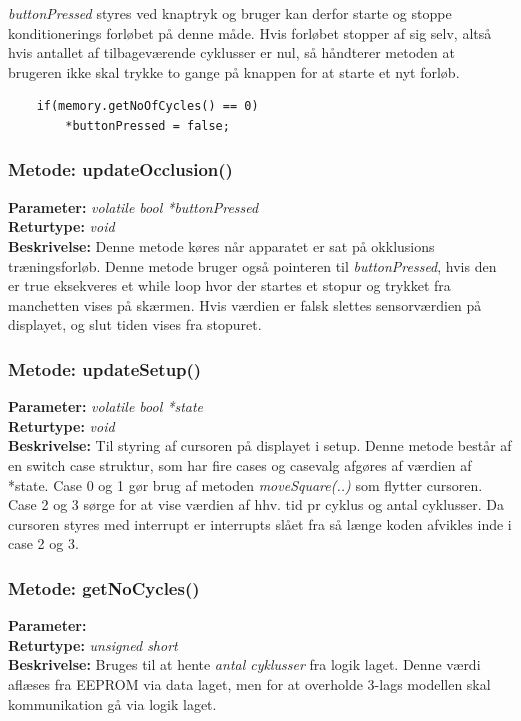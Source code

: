 \textit{buttonPressed} styres ved knaptryk og bruger kan derfor starte og stoppe konditionerings forløbet på denne måde. Hvis forløbet stopper af sig selv, altså hvis antallet af tilbageværende cyklusser er nul, så håndterer metoden at brugeren ikke skal trykke to gange på knappen for at starte et nyt forløb. 
\begin{lstlisting}
	if(memory.getNoOfCycles() == 0)
		*buttonPressed = false;
\end{lstlisting}

\subsubsection{Metode: updateOcclusion()}
\textbf{Parameter: } \textit{volatile bool *buttonPressed}
\\ \textbf{Returtype: } \textit{void}
\\ \textbf{Beskrivelse: } Denne metode køres når apparatet er sat på okklusions træningsforløb. Denne metode bruger også pointeren til \textit{buttonPressed}, hvis den er true eksekveres et while loop hvor der startes et stopur og trykket fra manchetten vises på skærmen. Hvis værdien er falsk slettes sensorværdien på displayet, og slut tiden vises fra stopuret.

\subsubsection{Metode: updateSetup()}
\textbf{Parameter: } \textit{volatile bool *state}
\\ \textbf{Returtype: } \textit{void}
\\ \textbf{Beskrivelse: } Til styring af cursoren på displayet i setup. Denne metode består af en switch case struktur, som har fire cases og casevalg afgøres af værdien af *state. Case 0 og 1 gør brug af metoden \textit{moveSquare(..)} som flytter cursoren. Case 2 og 3 sørge for at vise værdien af hhv. tid pr cyklus og antal cyklusser. Da cursoren styres med interrupt er interrupts slået fra så længe koden afvikles inde i case 2 og 3. 

\subsubsection{Metode: getNoCycles()}
\textbf{Parameter: } 
\\ \textbf{Returtype: } \textit{unsigned short}
\\ \textbf{Beskrivelse: } Bruges til at hente \textit{antal cyklusser} fra logik laget. Denne værdi aflæses fra EEPROM via data laget, men for at overholde 3-lags modellen skal kommunikation gå via logik laget. 

